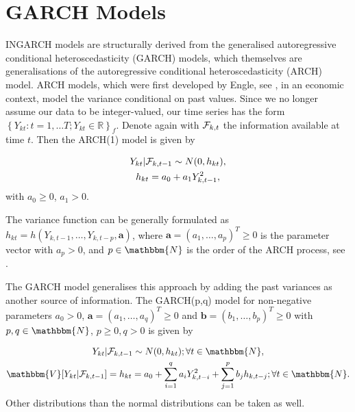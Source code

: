 
\section{GARCH Models}
\label{sec: Garch Models}

INGARCH models are structurally derived from the generalised autoregressive conditional heteroscedasticity (GARCH) models, which themselves are generalisations of the autoregressive conditional heteroscedasticity (ARCH) model. ARCH models, which were first developed by Engle, see \textcite{Engle:1982}, in an economic context, model the variance conditional on past values. Since we no longer assume our data to be integer-valued, our time series has the form $\left\{Y_{kt}:t=1,\ldots T; Y_{kt} \in \mathbb{R}\right\}_f$. Denote again with $\mathcal{F}_{k,t}$ the information available at time $t$. Then the ARCH(1) model is given by \textcite{Engle:1982}

\begin{equation}
\begin{gathered}
Y_{kt} | \mathcal{F}_{k,t-1} \sim N(0,h_{kt}),\\
h_{kt} = a_0 + a_1 Y_{k,t-1}^2,
\label{eq:ARCH model}
\end{gathered}
\end{equation}
%
with $a_0\geq0$, $a_1>0$. 

The variance function can be generally formulated as $h_{kt} = h(Y_{k,t-1},\ldots,Y_{k,t-p},\bm{a})$, where $\bm{a}=(a_1,\ldots,a_p)^T\geq 0$ is the parameter vector with $a_p>0$, and $p \in \mathbbm{N}$ is the order of the ARCH process, see \textcite{Engle:1982}. 

The GARCH model generalises this approach by adding the past variances as another source of information. The GARCH(p,q) model for non-negative parameters $a_0>0$, $\bm{a}=(a_1,\ldots,a_q)^T\geq 0$ and $\bm{b}=(b_1,\ldots,b_p)^T\geq0$ with $p,q \in \mathbbm{N}$, $p\geq0, q>0$ is given by \textcite{Bollerslev:1986}

\begin{equation}
\begin{gathered}
Y_{kt} | \SigA_{k,t-1} \sim N(0,h_{kt}); \forall t \in \mathbbm{N}, \\
\mathbbm{V}[Y_{kt}|\SigA_{k,t-1}]=h_{kt} = a_0 + \sum_{i=1}^q a_i Y_{k,t-i}^2 + \sum_{j=1}^p b_j h_{k,t-j};\forall t \in \mathbbm{N}.
\label{eq:GARCH model}
\end{gathered}
\end{equation}
%
Other distributions than the normal distributions can be taken as well. 

